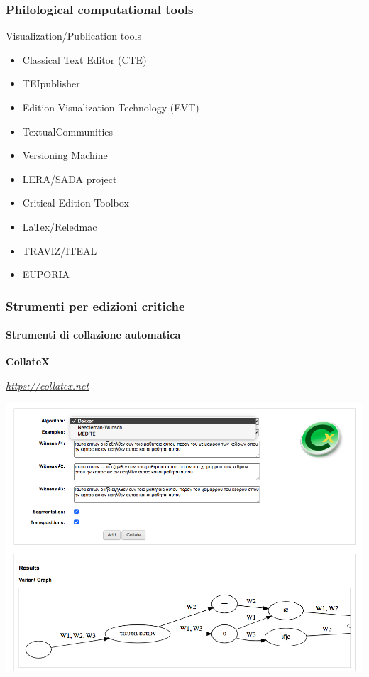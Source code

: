 \begin{frame}
	\frametitle{Philological computational tools}
	\addtocounter{nframe}{1}
    \begin{block}{Visualization/Publication tools}
		\begin{itemize}
			\item Classical Text Editor (CTE)
			\item TEIpublisher
			\item Edition Visualization Technology (EVT)
			\item TextualCommunities
			\item Versioning Machine
			\item LERA/SADA project
			\item Critical Edition Toolbox
			\item LaTex/Reledmac
			\item TRAVIZ/ITEAL
			\item EUPORIA
		\end{itemize}
	\end{block}
\end{frame}



\begin{frame}
    \frametitle{Strumenti per edizioni critiche}
    \framesubtitle{Strumenti di collazione automatica}
	\addtocounter{nframe}{1}
    \begin{center}
        \textbf{CollateX}
    \end{center}
    \begin{center}
        \textit{\url{https://collatex.net}}
	\end{center}
    \begin{center}
        \includegraphics[width=.95\textwidth]{imgs/collatex.png}
	\end{center}
\end{frame}

